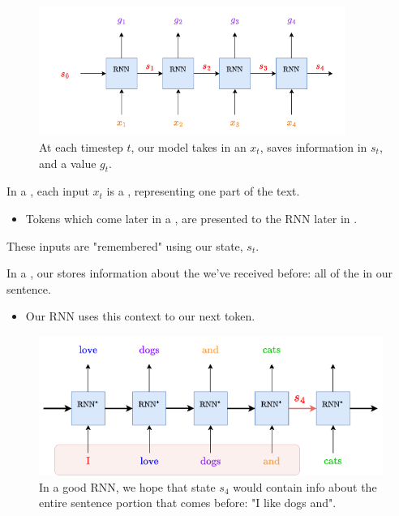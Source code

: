         \begin{figure}[H]
            \centering
            \includegraphics[width=100mm]{images/rnn_images/rnn_simple_g_notation.png}
            \caption*{At each timestep $t$, our model takes in an  $x_t$, saves information in  $s_t$, and  a value $g_t$.}
        \end{figure}

        \begin{concept}
            In a , each input $x_t$ is a , representing one part of the text.

            \begin{itemize}
                \item Tokens which come later in a , are presented to the RNN later in .
            \end{itemize}
        \end{concept}

        These inputs are "remembered" using our state, $s_t$.\\

        \begin{concept}
            In a , our  stores information about the  we've received before: all of the  in our sentence.

            \begin{itemize}
                \item Our RNN uses this context to  our next token.
            \end{itemize}
        \end{concept}
            

        \begin{figure}[H]
            \centering
            \includegraphics[width=0.7\linewidth]{images/transformers_images/rnn_state_memory.png}
            \caption*{In a good RNN, we hope that state $s_4$ would contain info about the entire sentence portion that comes before: "I like dogs and".}
        \end{figure}


